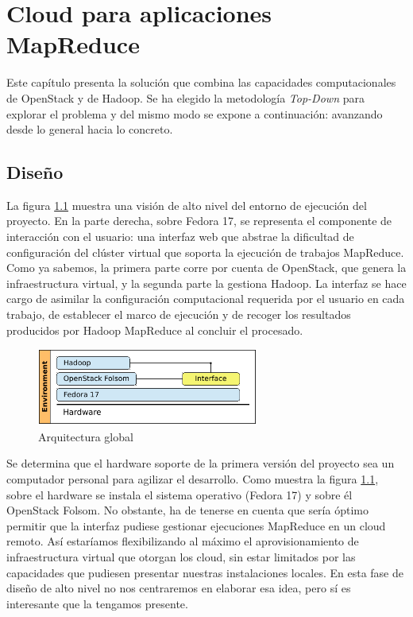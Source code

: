 \chapter{Cloud para aplicaciones MapReduce}\label{cap:solucion}
\noindent Este cap\'itulo presenta la soluci\'on que combina las capacidades computacionales de OpenStack y de Hadoop. Se ha elegido la metodolog\'ia \emph{Top-Down} para explorar el problema y del mismo modo se expone a continuaci\'on: avanzando desde lo general hacia lo concreto.


\section{Dise\~no}\label{sec:diseno}
\noindent La figura \ref{fig:arquitecturaglobal} muestra una visi\'on de alto nivel del entorno de ejecuci\'on del proyecto. En la parte derecha, sobre Fedora 17, se representa el componente de interacci\'on con el usuario: una interfaz web que abstrae la dificultad de configuraci\'on del cl\'uster virtual que soporta la ejecuci\'on de trabajos MapReduce. Como ya sabemos, la primera parte corre por cuenta de OpenStack, que genera la infraestructura virtual, y la segunda parte la gestiona Hadoop. La interfaz se hace cargo de asimilar la configuraci\'on computacional requerida por el usuario en cada trabajo, de establecer el marco de ejecuci\'on y de recoger los resultados producidos por Hadoop MapReduce al concluir el procesado.\newline

\begin{figure}[tbp]
\begin{center}
\includegraphics[width=0.65\textwidth]{imagenes/021.pdf}
 \caption{Arquitectura global}
\label{fig:arquitecturaglobal}
\end{center}
\end{figure}

Se determina que el hardware soporte de la primera versi\'on del proyecto sea un computador personal para agilizar el desarrollo. Como muestra la figura \ref{fig:arquitecturaglobal}, sobre el hardware se instala el sistema operativo (Fedora 17) y sobre \'el OpenStack Folsom. No obstante, ha de tenerse en cuenta que ser\'ia \'optimo permitir que la interfaz pudiese gestionar ejecuciones MapReduce en un cloud remoto. As\'i estar\'iamos flexibilizando al m\'aximo el aprovisionamiento de infraestructura virtual que otorgan los cloud, sin estar limitados por las capacidades que pudiesen presentar nuestras instalaciones locales. En esta fase de dise\~no de alto nivel no nos centraremos en elaborar esa idea, pero s\'i es interesante que la tengamos presente. \newline

